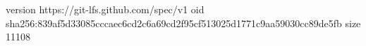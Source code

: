 version https://git-lfs.github.com/spec/v1
oid sha256:839af5d33085cccaec6cd2c6a69cd2f95cf513025d1771c9aa59030cc89de5fb
size 11108
